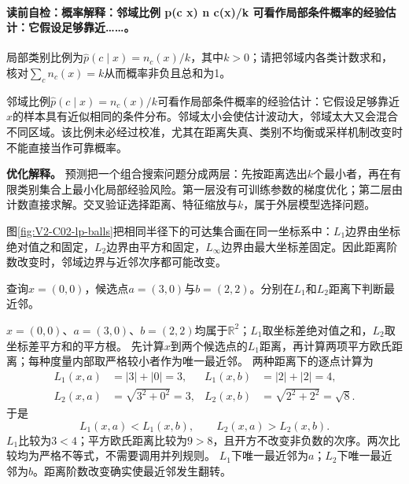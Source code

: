 \label{struct:V2-C02-CH15}
\paragraph{读前自检：概率解释：邻域比例 p(c x) n c(x)/k 可看作局部条件概率的经验估计：它假设足够靠近……。}\kNN{}局部类别比例为$\widehat p(c\mid x)=n_c(x)/k$，其中$k>0$；请把邻域内各类计数求和，核对$\sum_c n_c(x)=k$从而概率非负且总和为1。\par

\begin{probabilitybox}
邻域比例$\widehat p(c\mid x)=n_c(x)/k$可看作局部条件概率的经验估计：它假设足够靠近$x$的样本具有近似相同的条件分布。邻域太小会使估计波动大，邻域太大又会混合不同区域。该比例未必经过校准，尤其在距离失真、类别不均衡或采样机制改变时不能直接当作可靠概率。
\end{probabilitybox}

\label{struct:V2-C02-CH16}
\begin{optimizationbox}
\textbf{优化解释。}
\kNN{}预测把一个组合搜索问题分成两层：先按距离选出$k$个最小者，再在有限类别集合上最小化局部经验风险。第一层没有可训练参数的梯度优化；第二层由计数直接求解。交叉验证选择距离、特征缩放与$k$，属于外层模型选择问题。
\end{optimizationbox}

\label{struct:V2-C02-CH17}

图\ref{fig:V2-C02-lp-balls}把相同半径下的可达集合画在同一坐标系中：$L_1$边界由坐标绝对值之和固定，$L_2$边界由平方和固定，$L_\infty$边界由最大坐标差固定。因此距离阶数改变时，邻域边界与近邻次序都可能改变。

\label{struct:V2-C02-CH18}
\begin{example}[距离阶数改变近邻]\label{exm:V2-C02-lp-small}
查询$x=(0,0)$，候选点$a=(3,0)$与$b=(2,2)$。分别在$L_1$和$L_2$距离下判断最近邻。
\end{example}
\begin{solution}
\SolGiven $x=(0,0)$、$a=(3,0)$、$b=(2,2)$均属于$\mathbb R^2$；$L_1$取坐标差绝对值之和，$L_2$取坐标差平方和的平方根。
\SLMethodTrigger{$L_1$可直接比较绝对值之和；$L_2$距离非负，而平方函数在$[0,+\infty)$上严格递增，所以可比较平方距离避免无必要开方。}
\SolPlan 先计算$x$到两个候选点的$L_1$距离，再计算两项平方欧氏距离；每种度量内部取严格较小者作为唯一最近邻。
\SolDerive
两种距离下的逐点计算为
\[
\begin{aligned}
L_1(x,a)&=|3|+|0|=3,&
L_1(x,b)&=|2|+|2|=4,\\
L_2(x,a)&=\sqrt{3^2+0^2}=3,&
L_2(x,b)&=\sqrt{2^2+2^2}=\sqrt8.
\end{aligned}
\]
于是
\[
L_1(x,a)<L_1(x,b),
\qquad
L_2(x,a)>L_2(x,b).
\]
\SolCheck $L_1$比较为$3<4$；平方欧氏距离比较为$9>8$，且开方不改变非负数的次序。两次比较均为严格不等式，不需要调用并列规则。
\SolAnswer $L_1$下唯一最近邻为$a$；$L_2$下唯一最近邻为$b$。距离阶数改变确实使最近邻发生翻转。
\end{solution}

